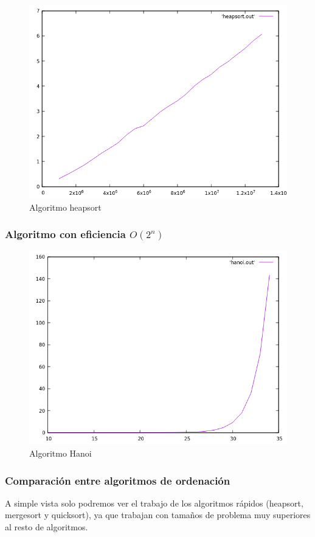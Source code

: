 \documentclass[12pt,spanish]{article}
\begin{document}
\begin{figure}[H]
\centering
\includegraphics[scale=0.75]{empirica_heapsort.png}
\caption{Algoritmo heapsort}
\end{figure}

\subsubsection{Algoritmo con eficiencia $O(2^n)$}

\begin{figure}[H]
\centering
\includegraphics[scale=0.75]{empirica_hanoi.png}
\caption{Algoritmo Hanoi}
\end{figure}

\subsubsection{Comparación entre algoritmos de ordenación}
A simple vista solo podremos ver el trabajo de los algoritmos rápidos (heapsort, mergesort y quicksort), ya que trabajan con tamaños de problema muy superiores al resto de algoritmos.
\end{document}

